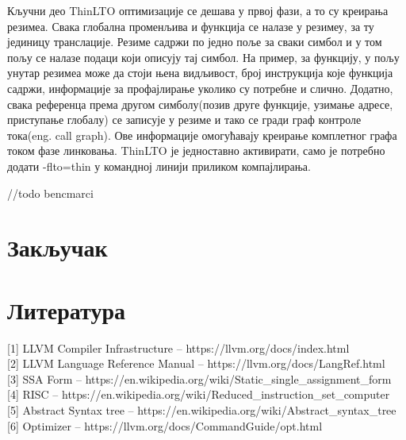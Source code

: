 \documentclass[12pt,oneside]{memoir}
\begin{document}
Кључни део ThinLTO оптимизације се дешава у првој фази, а то су креирања резимеа.
Свака глобална променљива и функција се налазе у резимеу, за ту јединицу транслације.
Резиме садржи по једно поље за сваки симбол и у том пољу
се налазе подаци који описују тај симбол.
На пример, за функцију, у пољу унутар резимеа може да стоји њена видљивост, 
број инструкција које функција садржи, информације за профајлирање уколико су потребне
и слично.
Додатно, свака референца према другом симболу(позив друге функције, узимање адресе,
приступање глобалу) се записује у резиме и тако се гради граф контроле тока(eng. call graph).
Ове информације омогућавају креирање комплетног графа током фазе линковања.
ThinLTO је једноставно активирати, само је потребно додати  -flto=thin у командној линији
приликом компајлирања.

//todo bencmarci


\chapter{Закључак}



\backmatter
\chapter{Литература}
[1] LLVM Compiler Infrastructure -- https://llvm.org/docs/index.html \\

[2] LLVM Language Reference Manual -- https://llvm.org/docs/LangRef.html \\

[3] SSA Form -- https://en.wikipedia.org/wiki/Static{\_}single{\_}assignment{\_}form \\
 
[4] RISC -- https://en.wikipedia.org/wiki/Reduced{\_}instruction{\_}set{\_}computer \\

[5] Abstract Syntax tree -- https://en.wikipedia.org/wiki/Abstract{\_}syntax{\_}tree \\

[6] Optimizer -- https://llvm.org/docs/CommandGuide/opt.html \\
\end{document}

